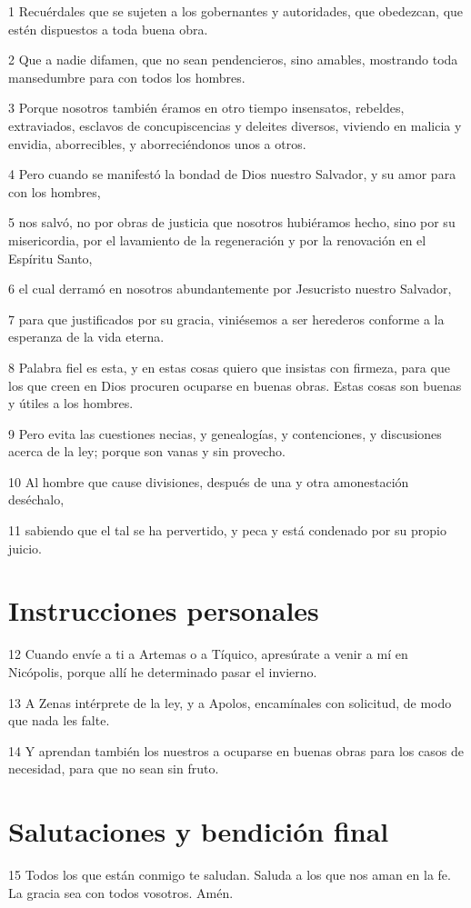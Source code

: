\par 1 Recuérdales que se sujeten a los gobernantes y autoridades, que obedezcan, que estén dispuestos a toda buena obra.
\par 2 Que a nadie difamen, que no sean pendencieros, sino amables, mostrando toda mansedumbre para con todos los hombres.
\par 3 Porque nosotros también éramos en otro tiempo insensatos, rebeldes, extraviados, esclavos de concupiscencias y deleites diversos, viviendo en malicia y envidia, aborrecibles, y aborreciéndonos unos a otros.
\par 4 Pero cuando se manifestó la bondad de Dios nuestro Salvador, y su amor para con los hombres,
\par 5 nos salvó, no por obras de justicia que nosotros hubiéramos hecho, sino por su misericordia, por el lavamiento de la regeneración y por la renovación en el Espíritu Santo,
\par 6 el cual derramó en nosotros abundantemente por Jesucristo nuestro Salvador,
\par 7 para que justificados por su gracia, viniésemos a ser herederos conforme a la esperanza de la vida eterna.
\par 8 Palabra fiel es esta, y en estas cosas quiero que insistas con firmeza, para que los que creen en Dios procuren ocuparse en buenas obras. Estas cosas son buenas y útiles a los hombres.
\par 9 Pero evita las cuestiones necias, y genealogías, y contenciones, y discusiones acerca de la ley; porque son vanas y sin provecho.
\par 10 Al hombre que cause divisiones, después de una y otra amonestación deséchalo,
\par 11 sabiendo que el tal se ha pervertido, y peca y está condenado por su propio juicio.

\section*{Instrucciones personales}

\par 12 Cuando envíe a ti a Artemas o a Tíquico, apresúrate a venir a mí en Nicópolis, porque allí he determinado pasar el invierno.
\par 13 A Zenas intérprete de la ley, y a Apolos, encamínales con solicitud, de modo que nada les falte.
\par 14 Y aprendan también los nuestros a ocuparse en buenas obras para los casos de necesidad, para que no sean sin fruto.

\section*{Salutaciones y bendición final}

\par 15 Todos los que están conmigo te saludan. Saluda a los que nos aman en la fe. La gracia sea con todos vosotros. Amén.

